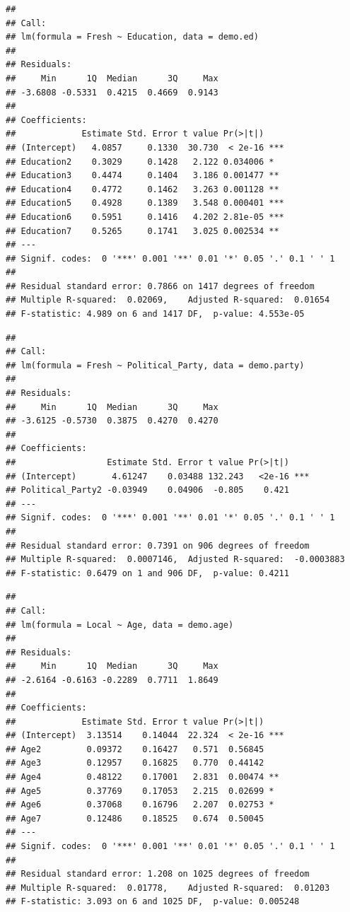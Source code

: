 \documentclass[
  12pt,
]{article}
\begin{document}
\begin{verbatim}
## 
## Call:
## lm(formula = Fresh ~ Education, data = demo.ed)
## 
## Residuals:
##     Min      1Q  Median      3Q     Max 
## -3.6808 -0.5331  0.4215  0.4669  0.9143 
## 
## Coefficients:
##             Estimate Std. Error t value Pr(>|t|)    
## (Intercept)   4.0857     0.1330  30.730  < 2e-16 ***
## Education2    0.3029     0.1428   2.122 0.034006 *  
## Education3    0.4474     0.1404   3.186 0.001477 ** 
## Education4    0.4772     0.1462   3.263 0.001128 ** 
## Education5    0.4928     0.1389   3.548 0.000401 ***
## Education6    0.5951     0.1416   4.202 2.81e-05 ***
## Education7    0.5265     0.1741   3.025 0.002534 ** 
## ---
## Signif. codes:  0 '***' 0.001 '**' 0.01 '*' 0.05 '.' 0.1 ' ' 1
## 
## Residual standard error: 0.7866 on 1417 degrees of freedom
## Multiple R-squared:  0.02069,    Adjusted R-squared:  0.01654 
## F-statistic: 4.989 on 6 and 1417 DF,  p-value: 4.553e-05
\end{verbatim}

\begin{verbatim}
## 
## Call:
## lm(formula = Fresh ~ Political_Party, data = demo.party)
## 
## Residuals:
##     Min      1Q  Median      3Q     Max 
## -3.6125 -0.5730  0.3875  0.4270  0.4270 
## 
## Coefficients:
##                  Estimate Std. Error t value Pr(>|t|)    
## (Intercept)       4.61247    0.03488 132.243   <2e-16 ***
## Political_Party2 -0.03949    0.04906  -0.805    0.421    
## ---
## Signif. codes:  0 '***' 0.001 '**' 0.01 '*' 0.05 '.' 0.1 ' ' 1
## 
## Residual standard error: 0.7391 on 906 degrees of freedom
## Multiple R-squared:  0.0007146,  Adjusted R-squared:  -0.0003883 
## F-statistic: 0.6479 on 1 and 906 DF,  p-value: 0.4211
\end{verbatim}

\begin{verbatim}
## 
## Call:
## lm(formula = Local ~ Age, data = demo.age)
## 
## Residuals:
##     Min      1Q  Median      3Q     Max 
## -2.6164 -0.6163 -0.2289  0.7711  1.8649 
## 
## Coefficients:
##             Estimate Std. Error t value Pr(>|t|)    
## (Intercept)  3.13514    0.14044  22.324  < 2e-16 ***
## Age2         0.09372    0.16427   0.571  0.56845    
## Age3         0.12957    0.16825   0.770  0.44142    
## Age4         0.48122    0.17001   2.831  0.00474 ** 
## Age5         0.37769    0.17053   2.215  0.02699 *  
## Age6         0.37068    0.16796   2.207  0.02753 *  
## Age7         0.12486    0.18525   0.674  0.50045    
## ---
## Signif. codes:  0 '***' 0.001 '**' 0.01 '*' 0.05 '.' 0.1 ' ' 1
## 
## Residual standard error: 1.208 on 1025 degrees of freedom
## Multiple R-squared:  0.01778,    Adjusted R-squared:  0.01203 
## F-statistic: 3.093 on 6 and 1025 DF,  p-value: 0.005248
\end{verbatim}
\end{document}
